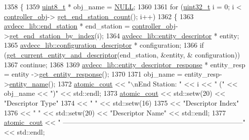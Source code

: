 \begin{DoxyCode}
1358 \{
1359     \hyperlink{stdint_8h_aba7bc1797add20fe3efdf37ced1182c5}{uint8\_t} * obj\_name = \hyperlink{openavb__types__base__pub_8h_a070d2ce7b6bb7e5c05602aa8c308d0c4}{NULL};
1360 
1361     \textcolor{keywordflow}{for} (\hyperlink{parse_8c_a6eb1e68cc391dd753bc8ce896dbb8315}{uint32\_t} i = 0; i < \hyperlink{classcmd__line_af0a7784509e5bf1210a2aa19cea5df70}{controller\_obj}->
      \hyperlink{classavdecc__lib_1_1controller_ab5ddf7b4a9718fe3e821289141f44485}{get\_end\_station\_count}(); i++)
1362     \{
1363         \hyperlink{classavdecc__lib_1_1end__station}{avdecc\_lib::end\_station} * end\_station = 
      \hyperlink{classcmd__line_af0a7784509e5bf1210a2aa19cea5df70}{controller\_obj}->\hyperlink{classavdecc__lib_1_1controller_a2a8ec1205ea0d5fdd6f833285257d0d0}{get\_end\_station\_by\_index}(i);
1364         \hyperlink{classavdecc__lib_1_1entity__descriptor}{avdecc\_lib::entity\_descriptor} * entity;
1365         \hyperlink{classavdecc__lib_1_1configuration__descriptor}{avdecc\_lib::configuration\_descriptor} * configuration;
1366         \textcolor{keywordflow}{if} (\hyperlink{classcmd__line_aa22ed7f036749918eb875043f10060c9}{get\_current\_entity\_and\_descriptor}(end\_station, &entity, &
      configuration))
1367             \textcolor{keywordflow}{continue};
1368 
1369         \hyperlink{classavdecc__lib_1_1entity__descriptor__response}{avdecc\_lib::entity\_descriptor\_response} * entity\_resp = entity
      ->\hyperlink{classavdecc__lib_1_1entity__descriptor_ac31dd117f0c931ae93c8ba52df7211bd}{get\_entity\_response}();
1370 
1371         obj\_name = entity\_resp->\hyperlink{classavdecc__lib_1_1entity__descriptor__response_a3abd11ceacbf37b685377f2b73a502ca}{entity\_name}();
1372         \hyperlink{cmd__line_8h_a0bc38ccc65c79ba06c6fcd7b4bf554c3}{atomic\_cout} << \textcolor{stringliteral}{"\(\backslash\)nEnd Station: "} << i << \textcolor{stringliteral}{" ("} << obj\_name << \textcolor{stringliteral}{")"} << std::endl;
1373         \hyperlink{cmd__line_8h_a0bc38ccc65c79ba06c6fcd7b4bf554c3}{atomic\_cout} << std::setw(20) << \textcolor{stringliteral}{"Descriptor Type"}
1374                     << \textcolor{stringliteral}{"   "} << std::setw(16)
1375                     << \textcolor{stringliteral}{"Descriptor Index"}
1376                     << \textcolor{stringliteral}{"   "} << std::setw(20) << \textcolor{stringliteral}{"Descriptor Name"} << std::endl;
1377         \hyperlink{cmd__line_8h_a0bc38ccc65c79ba06c6fcd7b4bf554c3}{atomic\_cout} << \textcolor{stringliteral}{"
      ------------------------------------------------------------------------------"} << std::endl;

\end{DoxyCode}
